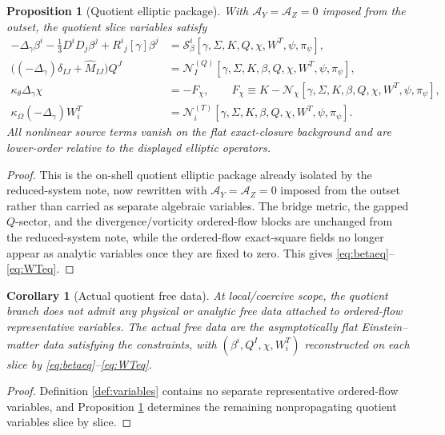 \documentclass[11pt]{article}
\newtheorem{proposition}{Proposition}
\newtheorem{corollary}{Corollary}
\begin{document}
\begin{proposition}[Quotient elliptic package]
\label{prop:aux}
With \(\mathcal A_Y=\mathcal A_Z=0\) imposed from the outset, the quotient slice variables satisfy
\begin{align}
-\Delta_\gamma\beta^i
-\frac13D^iD_j\beta^j
+R^i{}_j[\gamma]\beta^j
&=
\mathcal S_\beta^i[\gamma,\Sigma,K,Q,\chi,W^T,\psi,\pi_\psi],
\label{eq:betaeq}
\\
\bigl((-\Delta_\gamma)\delta_{IJ}+\widehat M_{IJ}\bigr)Q^J
&=
\mathcal N_I^{(Q)}[\gamma,\Sigma,K,\beta,Q,\chi,W^T,\psi,\pi_\psi],
\label{eq:Qeq}
\\
\kappa_\theta\Delta_\gamma\chi
&=
-F_\chi,
\qquad
F_\chi
\equiv
K-\mathcal N_\chi[\gamma,\Sigma,K,\beta,Q,\chi,W^T,\psi,\pi_\psi],
\label{eq:chieq}
\\
\kappa_\Omega(-\Delta_\gamma)W_i^T
&=
\mathcal N_i^{(T)}[\gamma,\Sigma,K,\beta,Q,\chi,W^T,\psi,\pi_\psi].
\label{eq:WTeq}
\end{align}
All nonlinear source terms vanish on the flat exact-closure background and are lower-order relative to the displayed elliptic operators.
\end{proposition}

\begin{proof}
This is the on-shell quotient elliptic package already isolated by the reduced-system note, now rewritten with \(\mathcal A_Y=\mathcal A_Z=0\) imposed from the outset rather than carried as separate algebraic variables. The bridge metric, the gapped \(Q\)-sector, and the divergence/vorticity ordered-flow blocks are unchanged from the reduced-system note, while the ordered-flow exact-square fields no longer appear as analytic variables once they are fixed to zero. This gives \eqref{eq:betaeq}--\eqref{eq:WTeq}.
\end{proof}

\begin{corollary}[Actual quotient free data]
\label{cor:freedata}
At local/coercive scope, the quotient branch does \emph{not} admit any physical or analytic free data attached to ordered-flow representative variables. The actual free data are the asymptotically flat Einstein--matter data satisfying the constraints, with \((\beta^i,Q^I,\chi,W_i^T)\) reconstructed on each slice by \eqref{eq:betaeq}--\eqref{eq:WTeq}.
\end{corollary}

\begin{proof}
Definition \ref{def:variables} contains no separate representative ordered-flow variables, and Proposition \ref{prop:aux} determines the remaining nonpropagating quotient variables slice by slice.
\end{proof}
\end{document}
